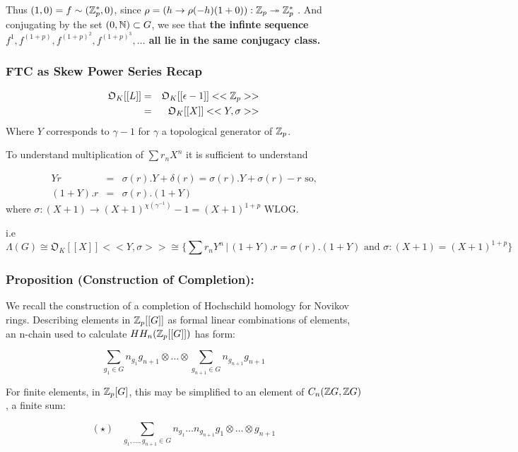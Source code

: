 Thus $(1,0) = f \sim (\mathbb Z_p^*,0)$, since $\rho = (h\rightarrow \rho (-h)(1+0)): \mathbb Z_p \twoheadrightarrow \mathbb Z_p^*$ . And conjugating by the set $(0,\mathbb N)\subset G$, we see that \textbf{the infinte sequence $f^1, f^{(1+p)}, f^{(1+p)^2}, f^{(1+p)^3}, \dots$ all lie in the same conjugacy class.}

\subsubsection{FTC as Skew Power Series Recap}

\begin{eqnarray}
\mathfrak O_K[[L]] 	&=& \mathfrak O_K [[\epsilon - 1]] <<\mathbb Z_p>>\\
				&=& \mathfrak O_K [[X]] <<Y, \sigma>>
				\end{eqnarray}
Where $Y$ corresponds to $\gamma -1$ for $\gamma$ a topological generator of $\mathbb Z_p$.

To understand multiplication of $\sum r_n X^n$ it is sufficient to understand

\begin{eqnarray}
Yr 	&=& \sigma(r). Y + \delta(r) = \sigma(r).Y+\sigma(r) - r\text{ so,}\\
(1+Y). r	&=&\sigma(r). (1+Y)
\end{eqnarray}
where $\sigma: (X+1)\rightarrow (X+1)^{\chi(\gamma^{-1})} - 1 = (X+1)^{1+p}\text{ WLOG}$.

i.e
$$\Lambda(G)\cong  \mathfrak O_K [[X]] <<Y, \sigma>> \cong\{ \sum r_n Y^n \,|\, (1+Y). r	=\sigma(r). (1+Y) \text{ and } \sigma: (X+1)= (X+1)^{1+p} \}$$






\subsubsection{Proposition (Construction of Completion):\label{COC}}

We recall the construction of a completion of Hochschild homology for Novikov rings. Describing elements in $\mathbb Z_p[[G]]$ as formal linear combinations of elements, an n-chain used to calculate $HH_n(\mathbb Z_p [[G]])$ has form:

$$\sum_{g_1\in G}n_{g_1} g_{n+1} \otimes\dots\otimes \sum_{g_{n+1}\in G}n_{g_{n+1}}g_{n+1}$$

For finite elements, in $\mathbb Z_p [G]$, this may be simplified to an element of $C_n({\mathbb Z G},{\mathbb Z G})$, a finite sum:

$$(\star)\,\,\,\,\, \sum_{g_1,\dots, g_{n+1}\in G} n_{g_1}\dots n_{g_{n+1}} g_1\otimes \dots \otimes g_{n+1}$$

